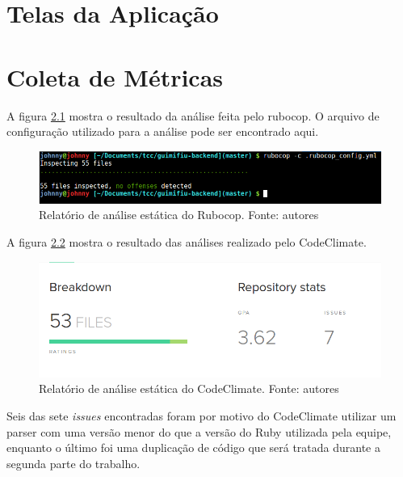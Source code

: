 \begin{anexosenv}

\partanexos

\chapter{Telas da Aplicação}
\label{chap:telas}

\chapter{Coleta de Métricas}
\label{chap:metricas}

A figura \ref{img:rubocop} mostra o resultado da análise feita pelo rubocop. O arquivo de configuração utilizado para a análise pode ser encontrado aqui.

\begin{figure}[H]
    \centering
    \includegraphics[scale=0.5]{figuras/rubocop.png}
    \caption[Relatório de análise estática do Rubocop]{Relatório de análise estática do Rubocop. Fonte: autores}
    \label{img:rubocop}
\end{figure}

A figura \ref{img:codeclimate} mostra o resultado das análises realizado pelo CodeClimate. 

\begin{figure}[H]
    \centering
    \includegraphics[scale=0.5]{figuras/codeclimate.png}
    \caption[Relatório de análise estática do CodeClimate]{Relatório de análise estática do CodeClimate. Fonte: autores}
    \label{img:codeclimate}
\end{figure}

Seis das sete \textit{issues} encontradas foram por motivo do CodeClimate utilizar um parser com uma versão menor do que a versão do Ruby utilizada pela equipe, enquanto o último foi uma duplicação de código que será tratada durante a segunda parte do trabalho.

\end{anexosenv}

